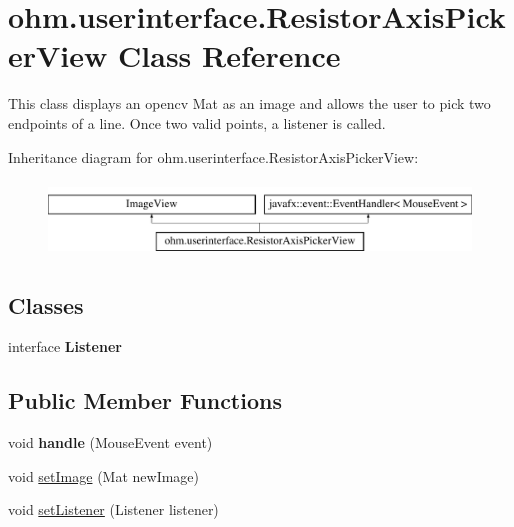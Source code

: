 \hypertarget{classohm_1_1userinterface_1_1_resistor_axis_picker_view}{}\section{ohm.\+userinterface.\+Resistor\+Axis\+Picker\+View Class Reference}
\label{classohm_1_1userinterface_1_1_resistor_axis_picker_view}


This class displays an opencv Mat as an image and allows the user to pick two endpoints of a line. Once two valid points, a listener is called.  


Inheritance diagram for ohm.\+userinterface.\+Resistor\+Axis\+Picker\+View\+:\begin{figure}[H]
\begin{center}
\leavevmode
\includegraphics[height=2.000000cm]{classohm_1_1userinterface_1_1_resistor_axis_picker_view}
\end{center}
\end{figure}
\subsection*{Classes}
\begin{DoxyCompactItemize}
\item 
interface {\bfseries Listener}
\end{DoxyCompactItemize}
\subsection*{Public Member Functions}
\begin{DoxyCompactItemize}
\item 
\hypertarget{classohm_1_1userinterface_1_1_resistor_axis_picker_view_a18f03b2e9fbfd47ce86d525dbd9aadd7}{}\label{classohm_1_1userinterface_1_1_resistor_axis_picker_view_a18f03b2e9fbfd47ce86d525dbd9aadd7} 
void {\bfseries handle} (Mouse\+Event event)
\item 
void \hyperlink{classohm_1_1userinterface_1_1_resistor_axis_picker_view_aca0066d9015235e9379505a8e89543b1}{set\+Image} (Mat new\+Image)
\item 
void \hyperlink{classohm_1_1userinterface_1_1_resistor_axis_picker_view_a78a2696e3a51570963bbf23870bee204}{set\+Listener} (Listener listener)
\end{DoxyCompactItemize}
